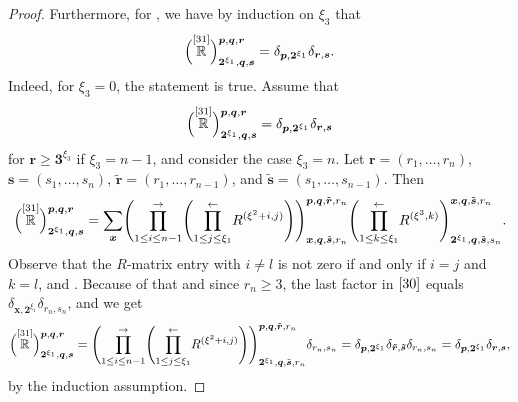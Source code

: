 \documentclass[pdftex]{sigma}
\numberwithin{equation}{section}
\begin{document}
\begin{proof}
Furthermore, for , we have by induction on $\xi_3$ that
\[
\Bigl(\overset{[31]}{\mathbb{R}} \Big)^{\boldsymbol{p},\boldsymbol{q},\boldsymbol{r}}_{\boldsymbol{2}^{\xi_1}, \boldsymbol{q},\boldsymbol{s}}=\delta_{\boldsymbol{p},\boldsymbol{2}^{\xi_1}} \delta_{\boldsymbol{r},\boldsymbol{s}}.
\]
Indeed, for $\xi_3=0$, the statement is true. Assume that
\[
\Bigl(\overset{[31]}{\mathbb{R}} \Big)^{\boldsymbol{p},\boldsymbol{q},\boldsymbol{r}}_{\boldsymbol{2}^{\xi_1},\boldsymbol{q},\boldsymbol{s}}=\delta_{\boldsymbol{p}, \boldsymbol{2}^{\xi_1}} \delta_{\boldsymbol{r},\boldsymbol{s}}
\]
for $\boldsymbol{r}\geq \boldsymbol {3}^{\xi_3}$ if $\xi_3=n-1$, and consider the case $\xi_3=n$.
Let $\boldsymbol{r}=(r_1,\dots,r_n)$, $\boldsymbol{s}=(s_1,\dots,s_n)$, $\tilde{\boldsymbol{r}}=(r_1,\dots,r_{n-1})$, and $\tilde{\boldsymbol{s}}=(s_1,\dots,s_{n-1})$. Then
\begin{equation}\label{30}
\Bigl(\overset{[31]}{\mathbb{R}} \Big)^{\boldsymbol{p},\boldsymbol{q},\boldsymbol{r}}_{\boldsymbol{2}^{\xi_1},\boldsymbol{q},\boldsymbol{s}}=\sum_{\boldsymbol{x}}
\Biggl( \overset{\rightarrow}{\prod\limits_{1\leq i\leq n-1}} \Biggl( \overset{\leftarrow}{\prod\limits_{1\leq j\leq \xi_1}} R^{(\xi^2+i,j)} \Biggr)\Biggr)^{\boldsymbol{p},\boldsymbol{q},\tilde{\boldsymbol{r}},r_n}_{\boldsymbol{x},\boldsymbol{q},\tilde{\boldsymbol{s}},r_n}
\Biggl( \overset{\leftarrow}{\prod\limits_{1\leq k\leq \xi_1}}R^{( \xi^3,k)}\Biggr)^{\boldsymbol{x},\boldsymbol{q},\tilde{\boldsymbol{s}},r_n}_{\boldsymbol{2}^{\xi_1},\boldsymbol{q},\tilde{\boldsymbol{s}},s_n}.
\end{equation}
Observe that the $R$-matrix entry  with $i\neq l$ is not zero if and only if $i=j$ and $k=l$, and . Because of that and since $r_n\geq 3$, the last factor  in $\eqref{30}$ equals $\delta_{\boldsymbol{x},\boldsymbol{2}^{\xi_1}} \delta_{r_n,s_n}$, and we get
\begin{equation*}%
\Bigl(\overset{[31]}{\mathbb{R}} \Big)^{\boldsymbol{p},\boldsymbol{q},\boldsymbol{r}}_{\boldsymbol{2}^{\xi_1},\boldsymbol{q},\boldsymbol{s}}=
\Biggl( \overset{\rightarrow}{\prod\limits_{1\leq i\leq n-1}} \Bigg(\overset{\leftarrow}{\prod\limits_{1\leq j\leq \xi_1}}R^{(\xi^2+i,j)} \Bigg)\Biggr)^{\boldsymbol{p},\boldsymbol{q},\tilde{\boldsymbol{r}},r_n}_{\boldsymbol{2}^{\xi_1},\boldsymbol{q},\tilde{\boldsymbol{s}},r_n}\delta_{r_n,s_n}
= \delta_{\boldsymbol{p},\boldsymbol{2}^{\xi_1}} \delta_{\boldsymbol{\tilde{r}},\boldsymbol{\tilde{s}}} \delta_{r_n,s_n}
= \delta_{\boldsymbol{p},\boldsymbol{2}^{\xi_1}} \delta_{\boldsymbol{{r}},\boldsymbol{{s}}},
\end{equation*}
by the induction assumption.


\end{proof}
\end{document}
